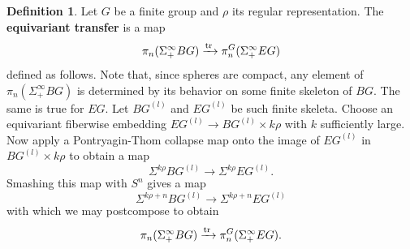 \documentclass[11pt]{amsart}
\newcommand{\tr}{\textup{tr}\,}
\theoremstyle{plain}   %
\theoremstyle{definition}
\newtheorem{df}[thm]{Definition}
\theoremstyle{remark}
\numberwithin{equation}{section}
\begin{document}
\begin{df}\label{df:equivariant transfer}
Let $G$ be a finite group and $\rho$ its regular representation. The \textbf{equivariant transfer} is a map 
\[
\pi_n(\Sigma_+^\infty BG)\xrightarrow{\tr} \pi_n^G(\Sigma_+^\infty EG)
\]
defined as follows. Note that, since spheres are compact, any element of $\pi_n(\Sigma_+^\infty BG)$ is determined by its behavior on some finite skeleton of $BG$. The same is true for $EG$. Let $BG^{(l)}$ and $EG^{(l)}$ be such finite skeleta. Choose an equivariant fiberwise embedding $EG^{(l)}\to BG^{(l)}\times k\rho$ with $k$ sufficiently large. Now apply a Pontryagin-Thom collapse map onto the image of $EG^{(l)}$ in $BG^{(l)}\times k\rho$ to obtain a map 
\[
\Sigma^{k\rho}BG^{(l)} \to \Sigma^{k\rho}EG^{(l)}.
\]
Smashing this map with $S^n$ gives a map 
\[
\Sigma^{k\rho+n}BG^{(l)}\to \Sigma^{k\rho+n}EG^{(l)}
\]
with which we may postcompose to obtain
\[
\pi_n(\Sigma_+^\infty BG)\xrightarrow{\tr} \pi_n^G(\Sigma_+^\infty EG).
\]
\end{df}
\end{document}
